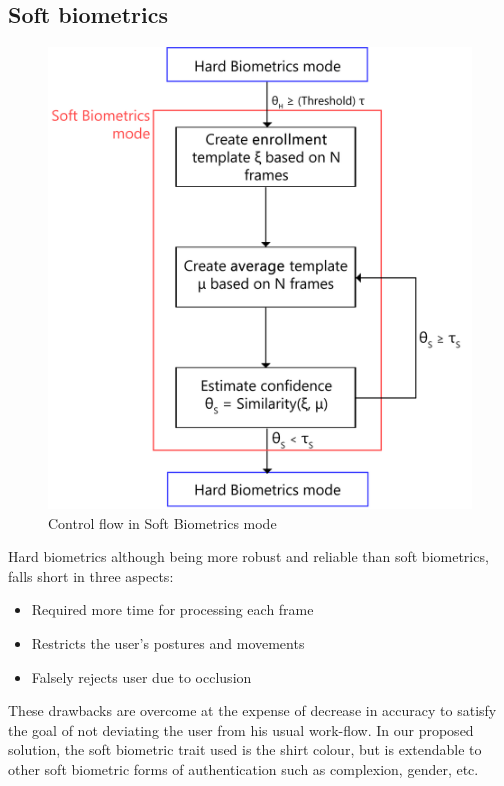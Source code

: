 \documentclass[%
        final,
        notitlepage,
        narroweqnarray,
        inline,
        ]{ieee}
\begin{document}
\subsection{Soft biometrics}
\begin{figure}[h!]
	\centering
	\includegraphics[scale=0.5]{img/soft_f.png}
	\caption{Control flow in Soft Biometrics mode}
	\label{fig:cfsb}
\end{figure}
Hard biometrics although being more robust and reliable than soft biometrics, falls short in three aspects\cite{Niin10}:
\begin{itemize}
	\item Required more time for processing each frame
	\item Restricts the user's postures and movements
	\item Falsely rejects user due to occlusion
\end{itemize}
These drawbacks are overcome at the expense of decrease in accuracy to satisfy the goal of not deviating the user from his usual work-flow. 
In our proposed solution, the soft biometric trait used is the shirt colour, but is extendable to other soft biometric forms of authentication such as complexion, gender\cite{Jain204}, etc. 
\end{document}
